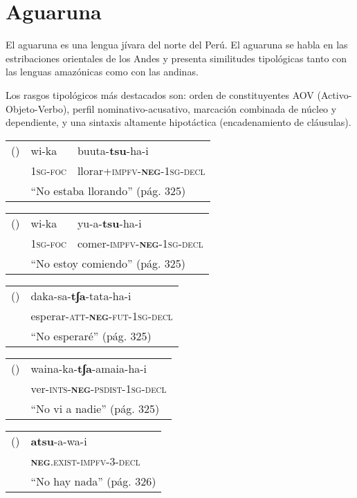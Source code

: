 \section*{Aguaruna}

\noindent El aguaruna es una lengua jívara del norte del Perú. El aguaruna se habla en las estribaciones orientales de los Andes y presenta similitudes tipológicas tanto con las lenguas amazónicas como con las andinas. 

Los rasgos tipológicos más destacados son: orden de constituyentes AOV (Activo-Objeto-Verbo), perfil nominativo-acusativo, marcación combinada de núcleo y dependiente, y una sintaxis altamente hipotáctica (encadenamiento de cláusulas). \vspace{0.5cm}

{\setmainfont{Charis SIL} 

\begin{tabular}{lll}
() & wi-ka & buuta-\textbf{tsu}-ha-i  \\
& \textsc{1sg-foc} & llorar+\textsc{impfv-\textbf{neg}-1sg-decl} \\
& \multicolumn{2}{l}{``No estaba llorando'' (pág. 325)}
\end{tabular} \vspace{0.5cm}

\begin{tabular}{lll}
() & wi-ka & yu-a-\textbf{tsu}-ha-i \\
& \textsc{1sg-foc} & comer-\textsc{impfv-\textbf{neg}-1sg-decl} \\
& \multicolumn{2}{l}{``No estoy comiendo'' (pág. 325)}
\end{tabular} \vspace{0.5cm}

\begin{tabular}{ll}
() & daka-sa-\textbf{tʃa}-tata-ha-i \\
& esperar-\textsc{att-\textbf{neg}-fut-1sg-decl} \\
& ``No esperaré'' (pág. 325)
\end{tabular} \vspace{0.5cm}

\begin{tabular}{ll}
() & waina-ka-\textbf{tʃa}-amaia-ha-i \\
& ver-\textsc{ints-\textbf{neg}-psdist-1sg-decl} \\
& ``No vi a nadie'' (pág. 325)
\end{tabular} \vspace{0.5cm}

\begin{tabular}{ll}
() & \textbf{atsu}-a-wa-i \\
& \textsc{\textbf{neg}.exist-impfv-3-decl} \\
& ``No hay nada'' (pág. 326)
\end{tabular} \vspace{0.5cm}

}

